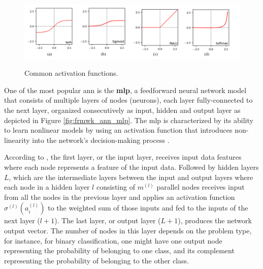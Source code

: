 \begin{figure}[htbp]
    \raggedright
        \caption{Common activation functions.}
        \includegraphics[width=1\textwidth]{resources/images/030-theoretical_framework/Framework_ann_activation_function.png}
        \label{fig:frmwk_ann_activation_functions}
\end{figure}

One of the most popular \gls{ann} is the \textbf{\gls{mlp}}, a feedforward neural network model that consists of multiple layers of nodes (neurons), each layer fully-connected to the next layer, organized consecutively as input, hidden and output layer as depicted in Figure \ref{fig:frmwk_ann_mlp}. The \gls{mlp} is characterized by its ability to learn nonlinear models by using an activation function that introduces non-linearity into the network's decision-making process \cite{Mitchell1997}.

According to \textcite{Russel2010}, the first layer, or the input layer, receives input data features where each node represents a feature of the input data. Followed by hidden layers $L$, which are the intermediate layers between the input and output layers where each node in a hidden layer $l$ consisting of $m^{(l)}$ parallel nodes receives input from all the nodes in the previous layer and applies an activation function $\sigma^{(l)}(a_i^{(l)})$ to the weighted sum of those inputs and fed to the inputs of the next layer ($l+1$). The last layer, or output layer ($L+1$), produces the network output vector. The number of nodes in this layer depends on the problem type, for instance, for binary classification, one might have one output node representing the probability of belonging to one class, and its complement representing the probability of belonging to the other class. 

